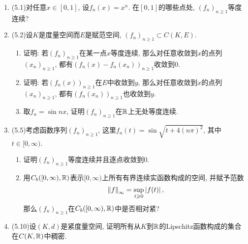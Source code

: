 \begin{enumerate}[label=\textbf{\arabic*.}, ref=\arabic*]
\begin{enumerate}[(1)]
\[\begin{cases}
		\end{cases}
		\]
		证明$ f\ast g\in L_1(\R) $且$ \norm{f\ast g}_1\leqslant\norm{f}_1\norm{g}_1 $.
		\item 取$ f=1_{[0,1]} $, 求$ f\ast f $.
		\end{enumerate}
	\item (5.1)对任意$ x\in[0,1] $, 设$ f_n(x)=x^n $. 在$ [0,1] $的哪些点处, $ (f_n)_{n\geqslant 1} $等度连续? 
	\item (5.2)设$ K $是度量空间而$ E $是赋范空间, $ (f_n)_{n\geqslant 1}\subset C(K,E) $.
		\begin{enumerate}[(1)]
		\item 证明: 若$ (f_n)_{n\geqslant 1} $在某一点$ x $等度连续, 那么对任意收敛到$ x $的点列$ (x_n)_{n\geqslant 1} $, 都有$ (f_n(x)-f_n(x_n))_{n\geqslant 1} $收敛到0.
		\item 证明: 若$ (f_n(x))_{n\geqslant 1} $在$ E $中收敛到$ y $, 那么对任意收敛到$ x $的点列$ (x_n)_{n\geqslant 1} $, 都有$ (f_n(x_n))_{n\geqslant 1} $也收敛到$ y $.
		\item 取$ f_n=\sin nx $, 证明$ (f_n)_{n\geqslant 1} $在$ \mathbb{R} $上无处等度连续. 
		\end{enumerate}
	\item (5.5)考虑函数序列$ (f_n)_{n\geqslant 1} $, 这里$ f_n(t)=\sin\sqrt{t+4( n\pi )^2} $, 其中$ t\in[0,\infty) $.
		\begin{enumerate}[(1)]
		\item 证明$ (f_n)_{n\geqslant 1} $等度连续并且逐点收敛到0.
		\item 用$ C_b([0,\infty),\mathbb{R}) $表示$ [0,\infty) $上所有有界连续实函数构成的空间, 并赋予范数
		\[
		\left\| f \right\|_\infty=\sup_{t\geqslant 0}\left| f(t) \right| ,
		\]
		那么$ (f_n)_{n\geqslant 1} $在$ C_b([0,\infty),\mathbb{R}) $中是否相对紧? 
		\end{enumerate}
	\item (5.10)设$ (K,d) $是紧度量空间, 证明所有从$ K $到$ \mathbb{R} $的Lipschitz函数构成的集合在$ C(K,\mathbb{R}) $中稠密. 
	\end{enumerate}


